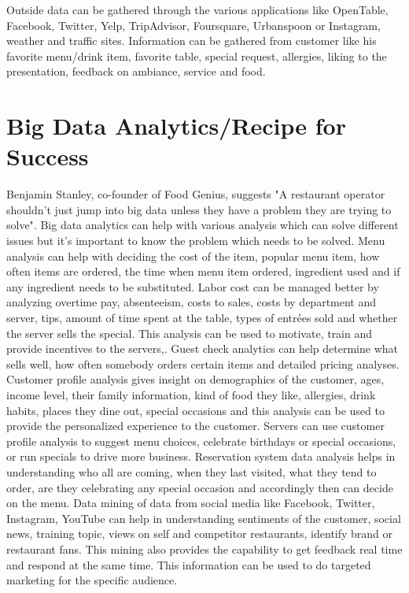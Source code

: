 \documentclass[sigconf]{acmart}
\begin{document}
Outside data can be gathered through the various applications like OpenTable, Facebook, Twitter, Yelp, TripAdvisor, Foursquare, Urbanspoon or Instagram, weather and traffic sites. Information can be gathered from customer like his favorite menu/drink item, favorite table, special request, allergies, liking to the presentation, feedback on ambiance, service and food. \cite{www-restaurant}

\section{Big Data Analytics/Recipe for Success}
Benjamin Stanley, co-founder of Food Genius, suggests "A restaurant operator shouldn't just jump into big data unless they have a problem they are trying to solve"\cite{KooserAmandaC.2013BD}. Big data analytics can help with various analysis which can solve different issues but it's important to know the problem which needs to be solved. Menu analysis can help with deciding the cost of the item, popular menu item, how often items are ordered, the time when menu item ordered, ingredient used and if any ingredient needs to be substituted\cite{KooserAmandaC.2013BD}. Labor cost can be managed better by analyzing overtime pay, absenteeism, costs to sales, costs by department and server, tips, amount of time spent at the table, types of entrées sold and whether the server sells the special. This analysis can be used to motivate, train and provide incentives to the servers\cite{www-restaurant},\cite{KooserAmandaC.2013BD}. Guest check analytics can help determine what sells well, how often somebody orders certain items and detailed pricing analyses\cite{www-restaurant}. Customer profile analysis gives insight on demographics of the customer, ages, income level, their family information, kind of food they like, allergies, drink habits, places they dine out, special occasions and this analysis can be used to provide the personalized experience to the customer\cite{www-restaurant}. Servers can use customer profile analysis to suggest menu choices, celebrate birthdays or special occasions, or run specials to drive more business. Reservation system data analysis helps in understanding who all are coming, when they last visited, what they tend to order, are they celebrating any special occasion and accordingly then can decide on the menu\cite{www-bostonglobe}. Data mining of data from social media like Facebook, Twitter, Instagram, YouTube can help in understanding sentiments of the customer, social news, training topic, views on self and competitor restaurants, identify brand or restaurant fans\cite{JENNINGSLISA2015Mbds}. This mining also provides the capability to get feedback real time and respond at the same time. This information can be used to do targeted marketing for the specific audience\cite{JENNINGSLISA2015Mbds}. 
\end{document}
